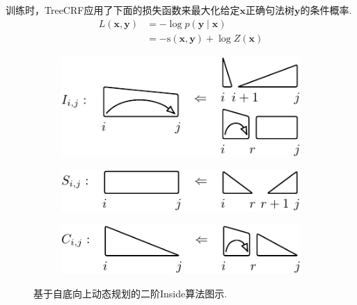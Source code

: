 训练时，TreeCRF应用了下面的损失函数来最大化给定$\boldsymbol{x}$正确句法树$\boldsymbol{y}$的条件概率.
\begin{equation}\label{eq:training-loss-treecrf}
    \begin{split}
        \mathit{L}(\boldsymbol{x},\boldsymbol{y}) &= -\log p(\boldsymbol{y}\mid\boldsymbol{x})  \\
        &= - \mathrm{s}(\boldsymbol{x}, \boldsymbol{y}) + \log Z(\boldsymbol{x})
    \end{split}
\end{equation}

\begin{figure}[tb]
    \centering
    \begin{subfigure}[b]{\textwidth}
        \begin{minipage}{\textwidth}
            \centering
            \includegraphics[scale=1.35]{figures/eisner-2o/a.pdf}
            \label{fig:eisner-2o-a}
        \end{minipage}
    \end{subfigure}
    \begin{subfigure}[b]{\textwidth}
        \begin{minipage}{\textwidth}
            \centering
            \includegraphics[scale=1.35]{figures/eisner-2o/b.pdf}
            \label{fig:eisner-2o-b}
        \end{minipage}
    \end{subfigure}
    \begin{subfigure}[b]{\textwidth}
        \begin{minipage}{\textwidth}
            \centering
            \includegraphics[scale=1.35]{figures/eisner-2o/c.pdf}
            \label{fig:eisner-2o-c}
        \end{minipage}
    \end{subfigure}
    \caption{基于自底向上动态规划的二阶Inside算法图示.}
    \label{fig:eisner-2o}
\end{figure}

